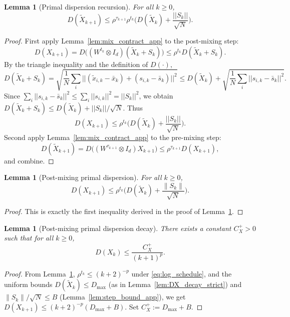 \documentclass[11pt,a4paper]{article}
\def\norm#1{||#1||}%
\newtheorem{lemma}[theorem]{Lemma}
\newcommand{\norm}[1]{\left\|#1\right\|}
\begin{document}
	\begin{lemma}[Primal dispersion recursion]\label{lem:DX_rec_strict}
		For all $k\ge 0$,
		\begin{equation}\label{eq:DX_rec_strict}
			D(\tilde X_{k+1})\le \rho^{\tau_{k+1}}\rho^{t_k}\Big(D(\tilde X_k)+\frac{\norm{S_k}}{\sqrt N}\Big).
		\end{equation}
	\end{lemma}
	\begin{proof}
		First apply Lemma~\ref{lem:mix_contract_app} to the post-mixing step:
		\[
		D(X_{k+1})=D\big((W^{t_k}\otimes I_d)(\tilde X_k+S_k)\big)
		\le \rho^{t_k} D(\tilde X_k+S_k).
		\]
		By the triangle inequality and the definition of $D(\cdot)$,
		\[
		D(\tilde X_k+S_k)=\sqrt{\frac1N\sum_i\norm{(\tilde x_{i,k}-\bar x_k)+(s_{i,k}-\bar s_k)}^2}
		\le D(\tilde X_k)+\sqrt{\frac1N\sum_i\norm{s_{i,k}-\bar s_k}^2}.
		\]
		Since $\sum_i\norm{s_{i,k}-\bar s_k}^2\le \sum_i\norm{s_{i,k}}^2=\norm{S_k}^2$, we obtain
		$D(\tilde X_k+S_k)\le D(\tilde X_k)+\norm{S_k}/\sqrt N$.
		Thus
		\[
		D(X_{k+1})\le \rho^{t_k}\Big(D(\tilde X_k)+\frac{\norm{S_k}}{\sqrt N}\Big).
		\]
		Second apply Lemma~\ref{lem:mix_contract_app} to the pre-mixing step:
		\[
		D(\tilde X_{k+1})=D\big((W^{\tau_{k+1}}\otimes I_d)X_{k+1}\big)\le \rho^{\tau_{k+1}} D(X_{k+1}),
		\]
		and combine.
	\end{proof}
	
	\begin{lemma}[Post-mixing primal dispersion]\label{lem:DX_post}
		For all $k\ge 0$,
		\[
		D(X_{k+1})\le \rho^{t_k}\Big(D(\tilde X_k)+\frac{\|S_k\|}{\sqrt N}\Big).
		\]
	\end{lemma}
	\begin{proof}
		This is exactly the first inequality derived in the proof of Lemma~\ref{lem:DX_rec_strict}.
	\end{proof}
	
	\begin{lemma}[Post-mixing primal dispersion decay]\label{lem:DX_post_decay}
		There exists a constant $C_X^{+}>0$ such that for all $k\ge 0$,
		\[
		D(X_k)\le \frac{C_X^{+}}{(k+1)^{p}}.
		\]
	\end{lemma}
	\begin{proof}
		From Lemma~\ref{lem:DX_post}, $\rho^{t_k}\le (k+2)^{-p}$ under \eqref{eq:log_schedule}, and the uniform bounds
		$D(\tilde X_k)\le D_{\max}$ (as in Lemma~\ref{lem:DX_decay_strict}) and $\|S_k\|/\sqrt N\le B$ (Lemma~\ref{lem:step_bound_app}),
		we get $D(X_{k+1})\le (k+2)^{-p}(D_{\max}+B)$. Set $C_X^{+}:=D_{\max}+B$.
	\end{proof}
	
\end{document}
